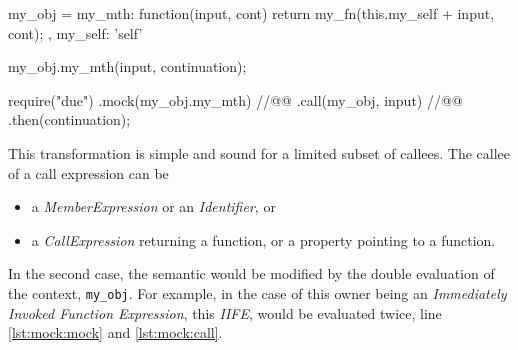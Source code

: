 \begin{code}[js, %
             caption={Inline mock of the callee}, %
             label={lst:mock}] %
my_obj = {
  my_mth: function(input, cont) {
    return my_fn(this.my_self + input, cont);
  },
  my_self: 'self'
}

my_obj.my_mth(input, continuation);

require("due")
.mock(my_obj.my_mth) //@\label{lst:mock:mock}@
.call(my_obj, input) //@\label{lst:mock:call}@
.then(continuation);
\end{code}

This transformation is simple and sound for a limited subset of callees.
The callee of a call expression can be
\begin{itemize}
  \item a \textit{MemberExpression} or an \textit{Identifier}, or
  \item a \textit{CallExpression} returning a function, or a property pointing to a function.
\end{itemize}
In the second case, the semantic would be modified by the double evaluation of the context, \texttt{my_obj}.
For example, in the case of this owner being an \textit{Immediately Invoked Function Expression}, this \textit{IIFE}, would be evaluated twice, line \ref{lst:mock:mock} and \ref{lst:mock:call}.












